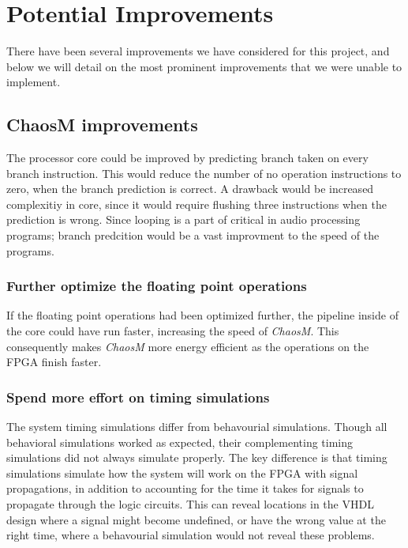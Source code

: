 \section{Potential Improvements}

There have been several improvements we have considered for this project, and
below we will detail on the most prominent improvements that we were unable to
implement.

\subsection{ChaosM improvements}

The processor core could be improved by predicting branch taken on every branch
instruction. This would reduce the number of no operation instructions to zero,
when the branch prediction is correct. A drawback would be increased complexitiy
in core, since it would require flushing three instructions when the prediction
is wrong. Since looping is a part of critical in audio processing programs;
branch predcition would be a vast improvment to the speed of the programs.
\subsubsection{Further optimize the floating point operations}

If the floating point operations had been optimized further, the pipeline inside
of the core could have run faster, increasing the speed of \textit{ChaosM}. This
consequently makes \textit{ChaosM} more energy efficient as the operations on
the FPGA finish faster.

\subsubsection{Spend more effort on timing simulations}

The system timing simulations differ from behavourial simulations. Though all behavioral
simulations worked as expected, their complementing timing simulations did
not always simulate properly.
The key difference is that timing simulations simulate how the system will work
on the FPGA with signal propagations, in addition to accounting for the time it
takes for signals to propagate through the logic circuits. This can reveal
locations in the VHDL design where a signal might become undefined, or have the
wrong value at the right time, where a behavourial simulation would not reveal
these problems.

